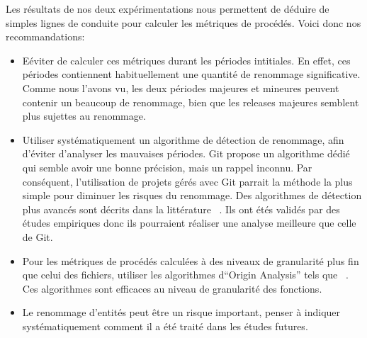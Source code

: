 Les résultats de nos deux expérimentations nous permettent de déduire de simples lignes de conduite pour calculer les métriques de procédés. Voici donc nos recommandations: 
\begin{itemize}
\item Eéviter de calculer ces métriques durant les périodes intitiales. En effet, ces périodes contiennent habituellement une quantité de renommage significative. Comme nous l'avons vu, les deux périodes majeures et mineures peuvent contenir un beaucoup de renommage, bien que les releases majeures semblent plus sujettes au renommage. 
\item Utiliser systématiquement un algorithme de détection de renommage, afin d'éviter d'analyser les mauvaises périodes. Git propose un algorithme dédié qui semble avoir une bonne précision, mais un rappel inconnu. Par conséquent, l'utilisation de projets gérés avec Git parrait la méthode la plus simple pour diminuer les risques du renommage. Des algorithmes de détection plus avancés sont décrits dans la littérature ~\cite{antoniol_automatic_2004,lavoie_inferring_2012,steidl_incremental_2014}. Ils ont étés validés par des études empiriques donc ils pourraient réaliser une analyse meilleure que celle de Git. 
\item Pour les métriques de procédés calculées à des niveaux de granularité plus fin que celui des fichiers, utiliser les algorithmes d``Origin Analysis'' tels que ~\cite{wu_aura:_2010}. Ces algorithmes sont efficaces au niveau de granularité des fonctions.
\item Le renommage d'entités peut être un risque important, penser à indiquer systématiquement comment il a été traité dans les études futures.\\       
\end{itemize}